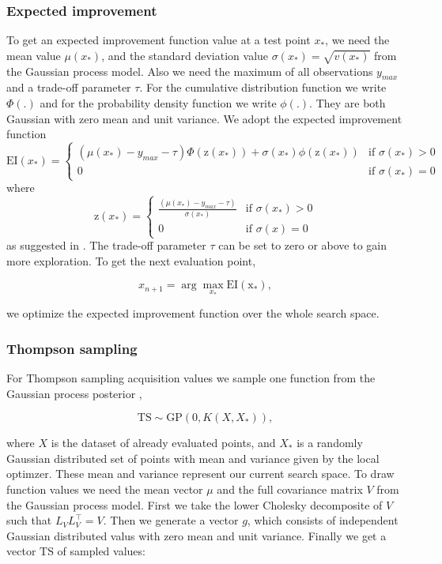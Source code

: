 \subsubsection{Expected improvement}
To get an expected improvement function value at a test point $x_*$, we need the mean value $\mu(x_*)$, and the standard deviation value $\sigma(x_*) = \sqrt{v(x_*)}$ from the Gaussian process model. Also we need the maximum of all observations $y_{max}$ and a trade-off parameter $\tau$. For the cumulative distribution function we write $\Phi(.)$ and for the probability density function we write $\phi(.)$. They are both Gaussian with zero mean and unit variance. We adopt the expected improvement function
\[
    \mathrm{EI}(x_*)=
\begin{cases}
    (\mu(x_*) - y_{max} - \tau)\Phi(\mathrm{z}(x_*))+\sigma(x_*)\phi(\mathrm{z}(x_*))& \text{if } \sigma(x_*)> 0\\
    0 & \text{if } \sigma(x_*)= 0
\end{cases}
\]
where
\[
    \mathrm{z}(x_*)=
\begin{cases}
    \frac{(\mu(x_*) -y_{max} - \tau)}{\sigma(x_*)} & \text{if } \sigma(x_*)> 0\\
    0 & \text{if } \sigma(x)= 0
\end{cases}
\]
as suggested in \cite{brochu2010tutorial}. The trade-off parameter $\tau$ can be set to zero or above to gain more exploration. To get the next evaluation point,

$$x_{n+1} = \arg \max_{x_*} \mathrm{EI(x_*)},$$

we optimize the expected improvement function over the whole search space.

\subsubsection{Thompson sampling}
For Thompson sampling acquisition values we sample one function from the Gaussian process posterior \cite{shahriari2016taking},

$$\mathrm{TS}\sim \mathrm{GP}(0,K(X,X_*)),$$

where $X$ is the dataset of already evaluated points, and $X_*$ is a randomly Gaussian distributed set of points with mean and variance given by the local optimzer. These mean and variance represent our current search space.
To draw function values we need the mean vector $\mu$ and the full covariance matrix $V$ from the Gaussian process model. First we take the lower Cholesky decomposite of $V$ such that $L_V L_V^\top = V$. Then we generate a vector $g$, which consists of independent Gaussian distributed valus with zero mean and unit variance. Finally we get a vector $\mathrm{TS}$ of sampled values:


